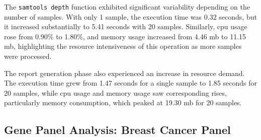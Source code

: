 The \texttt{samtools depth} function exhibited significant variability depending on the number of samples. With only 1 sample, the execution time was 0.32 seconds, but it increased substantially to 5.41 seconds with 20 samples. Similarly, \ac{cpu} usage rose from 0.90\% to 1.80\%, and memory usage increased from 4.46 \ac{mb} to 11.15 \ac{mb}, highlighting the resource intensiveness of this operation as more samples were processed.

The report generation phase also experienced an increase in resource demand. The execution time grew from 1.47 seconds for a single sample to 1.85 seconds for 20 samples, while \ac{cpu} usage and memory usage saw corresponding rises, particularly memory consumption, which peaked at 19.30 \ac{mb} for 20 samples.

\begin{table}[htbp] 
    \centering 
    \caption{Performance of Single Gene Analysis (JAK2) for 1, 10, and 20 Samples}
    \label{tab:single-gene-performance}
\end{table}

\subsection{Gene Panel Analysis: Breast Cancer Panel}

